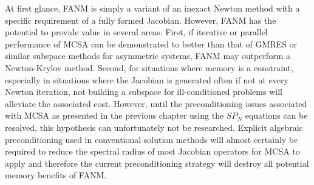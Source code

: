 At first glance, FANM is simply a variant of an inexact Newton method
with a specific requirement of a fully formed Jacobian. However, FANM
has the potential to provide value in several areas. First, if
iterative or parallel performance of MCSA can be demonstrated to
better than that of GMRES or similar subspace methods for asymmetric
systems, FANM may outperform a Newton-Krylov method. Second, for
situations where memory is a constraint, especially in situations
where the Jacobian is generated often if not at every Newton
iteration, not building a subspace for ill-conditioned problems will
alleviate the associated cost. However, until the preconditioning
issues associated with MCSA as presented in the previous chapter using
the $SP_N$ equations can be resolved, this hypothesis can
unfortunately not be researched. Explicit algebraic preconditioning
used in conventional solution methods will almost certainly be
required to reduce the spectral radius of most Jacobian operators for
MCSA to apply and therefore the current preconditioning strategy will
destroy all potential memory benefits of FANM.

